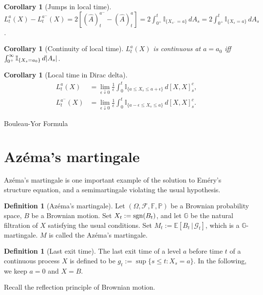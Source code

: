 \documentclass[openany,oneside]{book}
\newtheorem{cor}[thm]{Corollary}
\theoremstyle{definition}
\newtheorem{defn}[thm]{Definition}
\theoremstyle{remark}
\newcommand{\E}{\mathbb{E}} %
\renewcommand{\P}{\mathbb{P}} %
\newcommand{\I}{\mathbb{I}} %
\DeclarePairedDelimiter{\abs}{\lvert}{\rvert} %
\begin{document}
\begin{cor}[Jumps in local time]
$L^a_t(X) - L^{a^-}_t(X) = 2\left[(\hat{A})^{a^-}_t - (\hat{A})^a_t\right] = 2\int_{0^+}^t \I_{\{X_{s^-}=a\}} \,d A_s = 2\int_{0^+}^t \I_{\{X_{s}=a\}} \,d A_s$.
\end{cor}

\begin{cor}[Continuity of local time]
$L^a_t(X)$ is continuous at $a=a_0$ iff $\int_{0^+}^\infty \I_{\{X_s=a_0\}} \,d \abs{A_s}$.
\end{cor}

\begin{cor}[Local time in Dirac delta]
\begin{align*}
L^a_t(X) &= \lim_{\epsilon\downarrow 0} \frac{1}{\epsilon} \int_0^t \I_{\{a\le X_s \le a+\epsilon\}} \,d [X,X]^c_s, \\
L^{a^-}_t(X) &= \lim_{\epsilon\downarrow 0} \frac{1}{\epsilon} \int_0^t \I_{\{a-\epsilon \le X_s \le a\}} \,d [X,X]^c_s.
\end{align*}
\end{cor}


Bouleau-Yor Formula

\section{Az\'ema's martingale}
Az\'ema's martingale is one important example of the solution to Em\'ery's structure equation, and a semimartingale violating the usual hypothesis.

\begin{defn}[Az\'ema's martingale]
Let $(\Omega, \mathcal{F}, \mathbb{F}, \P)$ be a Brownian probability space, $B$ be a Brownian motion. Set $X_t := {\rm sgn}(B_t)$, and let $\mathbb{G}$ be the natural filtration of $X$ satisfying the usual conditions. Set $M_t := \E[B_t \,|\, \mathcal{G}_t]$, which is a $\mathbb{G}$-martingale. $M$ is called the Az\'ema's martingale.
\end{defn}

\begin{defn}[Last exit time]
The last exit time of a level $a$ before time $t$ of a continuous process $X$ is defined to be $g_t := \sup\{s\le t : X_s=a\}$. In the following, we keep $a=0$ and $X=B$.
\end{defn}

Recall the reflection principle of Brownian motion.
\end{document}
